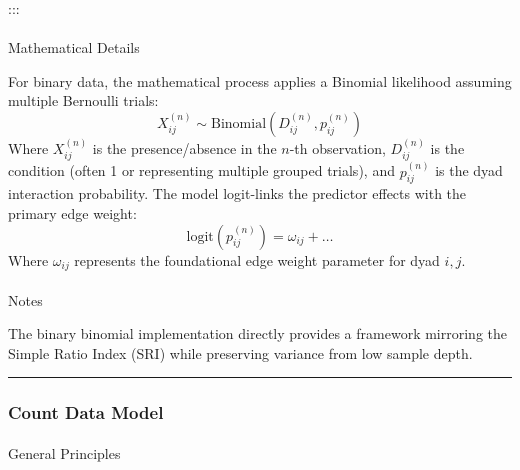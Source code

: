\documentclass[
  letterpaper,
  DIV=11,
  numbers=noendperiod]{scrartcl}
\makeatletter
\let\oldparagraph\paragraph
\renewcommand{\paragraph}{
    \@ifstar
      \xxxParagraphStar
      \xxxParagraphNoStar
  }
\newcommand{\xxxParagraphStar}[1]{\oldparagraph*{#1}\mbox{}}
\newcommand{\xxxParagraphNoStar}[1]{\oldparagraph{#1}\mbox{}}
\makeatother
\begin{document}
:::

\paragraph{Mathematical Details}\label{mathematical-details}

For binary data, the mathematical process applies a Binomial likelihood
assuming multiple Bernoulli trials: \[
X_{ij}^{(n)} \sim \text{Binomial}(D_{ij}^{(n)}, p_{ij}^{(n)})
\] Where \(X_{ij}^{(n)}\) is the presence/absence in the \(n\)-th
observation, \(D_{ij}^{(n)}\) is the condition (often 1 or representing
multiple grouped trials), and \(p_{ij}^{(n)}\) is the dyad interaction
probability. The model logit-links the predictor effects with the
primary edge weight: \[
\text{logit}(p_{ij}^{(n)}) = \omega_{ij} + \dots
\] Where \(\omega_{ij}\) represents the foundational edge weight
parameter for dyad \(i, j\).

\paragraph{Notes}\label{notes}

\begin{tcolorbox}[enhanced jigsaw, colframe=quarto-callout-note-color-frame, bottomtitle=1mm, coltitle=black, titlerule=0mm, colbacktitle=quarto-callout-note-color!10!white, colback=white, opacitybacktitle=0.6, rightrule=.15mm, toptitle=1mm, opacityback=0, arc=.35mm, left=2mm, title=\textcolor{quarto-callout-note-color}{\faInfo}\hspace{0.5em}{Note}, breakable, bottomrule=.15mm, toprule=.15mm, leftrule=.75mm]

The binary binomial implementation directly provides a framework
mirroring the Simple Ratio Index (SRI) while preserving variance from
low sample depth.

\end{tcolorbox}

\begin{center}\rule{0.5\linewidth}{0.5pt}\end{center}

\subsubsection{Count Data Model}\label{count-data-model}

\paragraph{General Principles}\label{general-principles-4}
\end{document}
